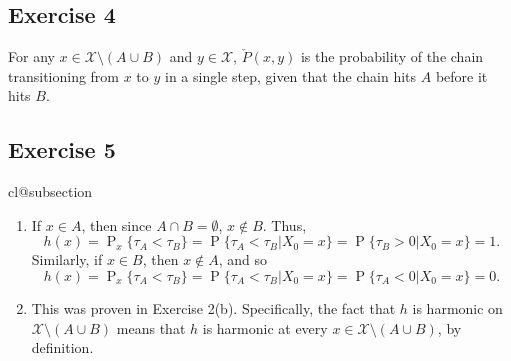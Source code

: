 \documentclass[12pt]{article}
\makeatletter
\def\nullstepcounter#1{%
	\begingroup
		\let\@elt\@stpelt
		\csname cl@#1\endcsname
	\endgroup}
\DeclareMathOperator{\Prob}{P}
\makeatother
\begin{document}
\subsection*{Exercise 4}

For any $x \in \mathcal{X} \setminus (A \cup B)$ and $y \in \mathcal{X}$, $\check{P}(x, y)$ is the probability of the chain transitioning from $x$ to $y$ in a single step, given that the chain hits $A$ before it hits $B$.

\subsection*{Exercise 5}
\nullstepcounter{subsection}

\begin{enumerate}[label=(\alph*)]
\item
If $x \in A$, then since $A \cap B = \emptyset$, $x \not \in B$. Thus,
\begin{equation*}
h(x) = \Prob_x\{\tau_A < \tau_B\} = \Prob\{\tau_A < \tau_B | X_0 = x\} = \Prob\{\tau_B > 0 | X_0 = x\} = 1.
\end{equation*}
Similarly, if $x \in B$, then $x \not \in A$, and so
\begin{equation*}
h(x) = \Prob_x\{\tau_A < \tau_B\} = \Prob\{\tau_A < \tau_B | X_0 = x\} = \Prob\{\tau_A < 0 | X_0 = x\} = 0.
\end{equation*}

\item
This was proven in Exercise 2(b). Specifically, the fact that $h$ is harmonic on $\mathcal{X} \setminus (A \cup B)$ means that $h$ is harmonic at every $x \in \mathcal{X} \setminus (A \cup B)$, by definition.

\end{enumerate}
\end{document}
